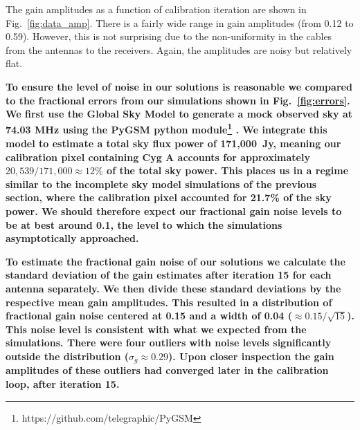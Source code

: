\documentclass[a4paper,fleqn,usenatbib]{../mnras}
\begin{document}
The gain amplitudes as a function of calibration iteration are shown in 
Fig.~\ref{fig:data_amp}. There is a fairly wide range in gain amplitudes (from 0.12 to 0.59). 
However, this is not surprising due to the non-uniformity in the cables from the antennas to the 
receivers. Again, the amplitudes are noisy but relatively flat.

\textbf{To ensure the level of noise in our solutions is reasonable we compared to the fractional errors
from our simulations shown in Fig.~\ref{fig:errors}. We first use the Global Sky Model
\citep{deo08} to generate a mock observed sky at 74.03 MHz using the PyGSM python 
module\footnote{https://github.com/telegraphic/PyGSM} \citep{pri16}. We integrate this model
to estimate a total sky flux power of 171,000~Jy, meaning our calibration pixel containing
Cyg A accounts for  approximately $20,539/171,000 \approx 12\%$ of the total sky power. 
This places us in a regime similar to the incomplete sky model simulations of the 
previous section, where the calibration pixel accounted for 21.7\% of the sky power. We 
should therefore expect our fractional gain noise levels to be at best around 0.1, the level 
to which the simulations asymptotically approached. }

\textbf{To estimate the fractional gain noise of our solutions we calculate the standard deviation of the gain
estimates after iteration 15 for each antenna separately. We then divide these standard
deviations by the respective mean gain amplitudes. This resulted in a distribution of fractional
gain noise centered at 0.15 and a width of 0.04 ($\approx 0.15/\sqrt{15}$). This noise level
is consistent with what we expected from the simulations.
There were four outliers with noise levels significantly outside the distribution 
($\sigma_g \approx 0.29$). Upon closer inspection the gain amplitudes of these outliers had
converged later in the calibration loop, after iteration 15.}
\end{document}
